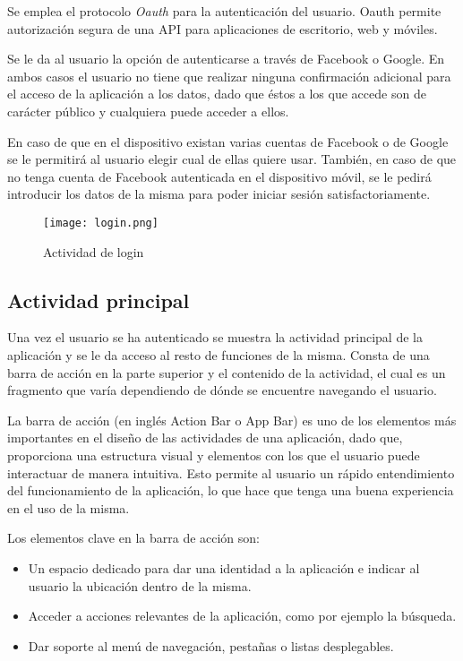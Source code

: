 Se emplea el protocolo \textit{Oauth} \cite{URL::Oauth} para la autenticación del usuario. 
Oauth permite autorización segura de una API para aplicaciones de escritorio, web y móviles. 
\newline

Se le da al usuario la opción de autenticarse a través de Facebook o Google. En ambos casos 
el usuario no tiene que realizar ninguna confirmación adicional para el acceso de la aplicación 
a los datos, dado que éstos a los que accede son de carácter público y cualquiera puede acceder a ellos. 

En caso de que en el dispositivo existan varias cuentas de Facebook o de Google se le permitirá al usuario
elegir cual de ellas quiere usar. También, en caso de que no tenga cuenta de Facebook autenticada en el dispositivo
móvil, se le pedirá introducir los datos de la misma para poder iniciar sesión satisfactoriamente.

\begin{figure}[h]
	\centering
	\texttt{[image: login.png]}
	\caption{Actividad de login}
	\label{fig:ejemplo}
\end{figure}

\subsection{Actividad principal}

Una vez el usuario se ha autenticado se muestra la actividad principal de la 
aplicación y se le da acceso al resto de funciones de la misma. Consta de una 
barra de acción en la parte superior y el contenido de la actividad, el cual es 
un fragmento que varía dependiendo de dónde se encuentre navegando el usuario. 

La barra de acción (en inglés Action Bar o App Bar) es uno de los elementos más
importantes en el diseño de las actividades de una aplicación, dado que, 
proporciona una estructura visual y elementos con los que el usuario puede 
interactuar de manera intuitiva. Esto permite al usuario un rápido entendimiento
del funcionamiento de la aplicación, lo que hace que tenga una buena experiencia 
en el uso de la misma.

Los elementos clave en la barra de acción son: 

\begin{itemize}
\item Un espacio dedicado para dar una identidad a la aplicación e indicar al
usuario la ubicación dentro de la misma.
\item Acceder a acciones relevantes de la aplicación, como por ejemplo la búsqueda.
\item Dar soporte al menú de navegación, pestañas o listas desplegables.
\end{itemize}

